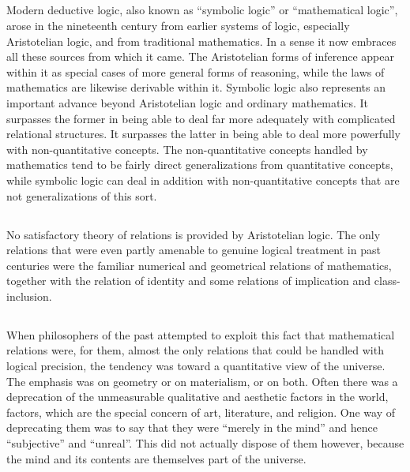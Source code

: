\documentclass{book}
\begin{document}
\subsection{}
\label{sec:1.1}

Modern deductive logic, also known as “symbolic logic” or “mathematical logic”, arose in the nineteenth century from earlier systems of logic, especially Aristotelian logic, and from traditional mathematics.  In a sense it now embraces all these sources from which it came.  The Aristotelian forms of inference appear within it as special cases of more general forms of reasoning, while the laws of mathematics are likewise derivable within it.  Symbolic logic also represents an important advance beyond Aristotelian logic and ordinary mathematics.  It surpasses the former in being able to deal far more adequately with complicated relational structures.  It surpasses the latter in being able to deal more powerfully with non-quantitative concepts.  The non-quantitative concepts handled by mathematics tend to be fairly direct generalizations from quantitative concepts, while symbolic logic can deal in addition with non-quantitative concepts that are not generalizations of this sort.

\subsection{}
\label{sec:1.2}

No satisfactory theory of relations is provided by Aristotelian logic.  The only relations that were even partly amenable to genuine logical treatment in past centuries were the familiar numerical and geometrical relations of mathematics, together with the relation of identity and some relations of implication and class-inclusion.

\subsection{}
\label{sec:1.3}

When philosophers of the past attempted to exploit this fact that mathematical relations were, for them, almost the only relations that could be handled with logical precision, the tendency was toward a quantitative view of the universe.  The emphasis was on geometry or on materialism, or on both.  Often there was a deprecation of the unmeasurable qualitative and aesthetic factors in the world, factors, which are the special concern of art, literature, and religion.  One way of deprecating them was to say that they were “merely in the mind” and hence “subjective” and “unreal”.  This did not actually dispose of them however, because the mind and its contents are themselves part of the universe.
\end{document}
